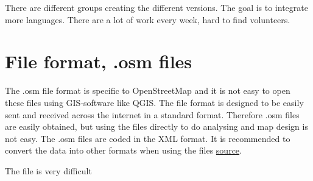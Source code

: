 There are different groups creating the different versions. The goal is to integrate more languages. There are a lot of work every week, hard to find volunteers. 


 \section{File format, .osm files}
The .osm file format is specific to OpenStreetMap and it is not easy to open these files using GIS-software like QGIS. The file format is designed to be easily sent and received across the internet in a standard format. Therefore .osm files are easily obtained, but using the files directly to do analysing and map design is not easy. The .osm files are coded in the XML format. It is recommended to convert the data into other formats when using the files \href{http://learnosm.org/en/osm-data/file-formats/}{source}. 

The file is very difficult 








 